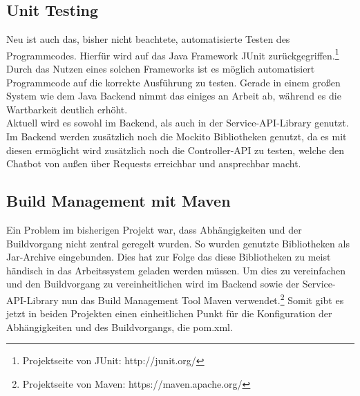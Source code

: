 \subsection{Unit Testing}
	Neu ist auch das, bisher nicht beachtete, automatisierte Testen des
	Programmcodes. Hierfür wird auf das Java Framework JUnit
	zurückgegriffen.\footnote{Projektseite von JUnit: http://junit.org/} Durch das
	Nutzen eines solchen Frameworks ist es möglich automatisiert Programmcode auf
	die korrekte Ausführung zu testen. Gerade in einem großen System wie dem
	Java Backend nimmt das einiges an Arbeit ab, während es die Wartbarkeit
	deutlich erhöht.\\
	Aktuell wird es sowohl im Backend, als auch in der Service-API-Library genutzt.\\
	Im Backend werden zusätzlich noch die Mockito Bibliotheken genutzt, da es mit
	diesen ermöglicht wird zusätzlich noch die Controller-API zu testen, welche den
	Chatbot von außen über Requests erreichbar und ansprechbar macht.

\subsection{Build Management mit Maven}
	Ein Problem im bisherigen Projekt war, dass Abhängigkeiten und der Buildvorgang
	nicht zentral geregelt wurden. So wurden genutzte Bibliotheken als Jar-Archive
	eingebunden. Dies hat zur Folge das diese Bibliotheken zu meist händisch in das
	Arbeitssystem geladen werden müssen. Um dies zu vereinfachen und den
	Buildvorgang zu vereinheitlichen wird im Backend sowie der Service-API-Library
	nun das Build Management Tool Maven verwendet.\footnote{Projektseite von Maven:
	https://maven.apache.org/} Somit gibt es jetzt in beiden Projekten einen
	einheitlichen Punkt für die Konfiguration der Abhängigkeiten und des
	Buildvorgangs, die pom.xml.

